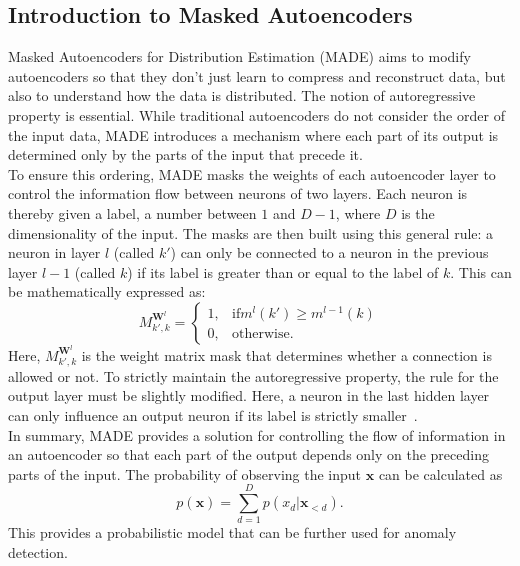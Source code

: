 \subsection{Introduction to Masked Autoencoders}
\label{theory:made}
Masked Autoencoders for Distribution Estimation (MADE) aims to modify autoencoders so that they don't just learn to compress and reconstruct data, but also to understand how the data is distributed. The notion of autoregressive property is essential. While traditional autoencoders do not consider the order of the input data, MADE introduces a mechanism where each part of its output is determined only by the parts of the input that precede it.\\
To ensure this ordering, MADE masks the weights of each autoencoder layer to control the information flow between neurons of two layers. Each neuron is thereby given a label, a number between $1$ and $D-1$, where $D$ is the dimensionality of the input. The masks are then built using this general rule: a neuron in layer $l$ (called $k'$) can only be connected to a neuron in the previous layer $l-1$ (called $k$) if its label is greater than or equal to the label of $k$. This can be mathematically expressed as:
\[ M^{\mathbf{W}^l}_{k',k}=\begin{cases}
    1, & \text{if} m^l(k')\geq m^{l-1}(k) \\
    0, & \text{otherwise.}
  \end{cases} \]
Here, $M^{\mathbf{W}^l}_{k',k}$ is the weight matrix mask that determines whether a connection is allowed or not. To strictly maintain the autoregressive property, the rule for the output layer must be slightly modified. Here, a neuron in the last hidden layer can only influence an output neuron if its label is strictly smaller~\cite{germain2015made}.\\
In summary, MADE provides a solution for controlling the flow of information in an autoencoder so that each part of the output depends only on the preceding parts of the input. The probability of observing the input $\mathbf{x}$ can be calculated as
\[ p(\mathbf{x}) = \sum_{d=1}^{D} p(x_d | \mathbf{x}_{<d}) .\]
This provides a probabilistic model that can be further used for anomaly detection.



